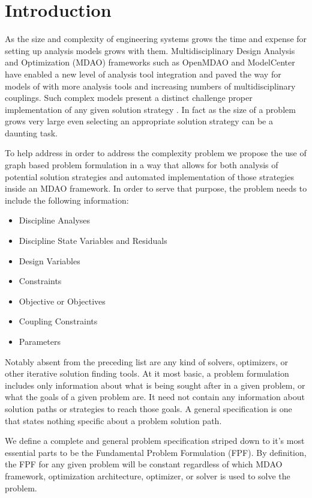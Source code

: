 \section{Introduction}
    
    As the size and complexity of engineering systems grows the time and expense for setting up 
    analysis models grows with them. Multidisciplinary Design Analysis and Optimization (MDAO)
    frameworks such as OpenMDAO\cite{Gray2012} and ModelCenter have enabled a new level of analysis tool integration 
    and paved the way for models of with more analysis tools and increasing numbers of multidisciplinary couplings. 
    Such complex models present a distinct challenge proper implementation of any given solution strategy . 
    In fact as the size of a problem grows very large even selecting an appropriate solution strategy can be a daunting 
    task. 

    To help address in order to address the complexity problem we propose the use of graph based problem formulation 
    in a way that allows for both analysis of potential solution strategies and automated implementation of those strategies 
    inside an MDAO framework. In order to serve that purpose, the problem  needs to include the following information: 
    \begin{itemize}
       \item Discipline Analyses 
       \item Discipline State Variables and Residuals
       \item Design Variables
       \item Constraints
       \item Objective or Objectives
       \item Coupling Constraints
       \item Parameters
    \end{itemize}
    Notably absent from the preceding list are any kind of solvers, optimizers, or other iterative solution finding tools. 
    At it most basic, a problem formulation includes only information about what is being sought after in a given problem, or what the
    goals of a given problem are. It need not contain any information about solution paths or strategies to reach those goals. 
    A general specification is one that states nothing specific about a problem solution path. 

    We define a complete and general problem specification striped down to it's most essential parts to be the 
    Fundamental Problem Formulation (FPF). By definition, the FPF for any given problem will be constant regardless 
    of which MDAO framework, optimization architecture, optimizer, or solver is used to solve the problem.

